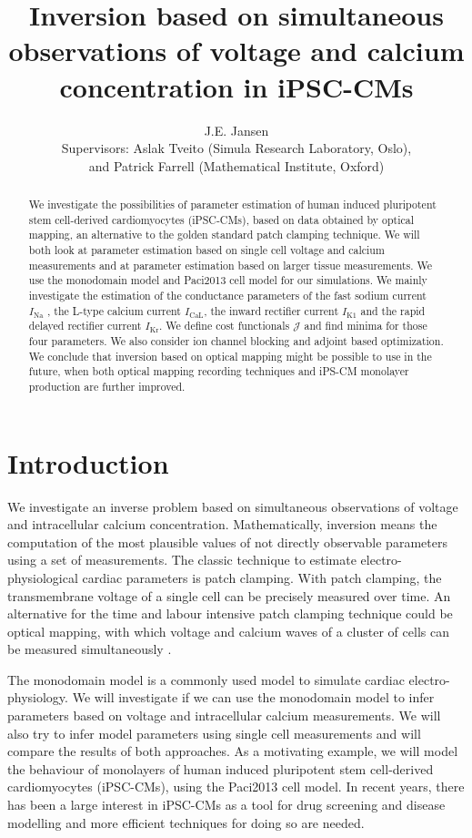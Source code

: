 \documentclass{article}
\title{Inversion based on simultaneous observations of voltage and calcium concentration in iPSC-CMs}
\author{J.E. Jansen \\[8 pt] Supervisors: Aslak Tveito (Simula Research Laboratory, Oslo), \\ and Patrick Farrell (Mathematical Institute, Oxford)
}
\begin{document}
%
\maketitle
%
\begin{abstract}We investigate the possibilities of parameter estimation of human induced pluripotent stem cell-derived cardiomyocytes (iPSC-CMs), based on data obtained by optical mapping, an alternative to the golden standard patch clamping technique. We will both look at parameter estimation based on single cell voltage and calcium measurements and at parameter estimation based on larger tissue measurements. We use the monodomain model and Paci2013 cell model for our simulations. We mainly investigate the estimation of the conductance parameters of the fast sodium current $I_{\mathrm{Na}}$ , the L-type calcium current $I_{\mathrm{CaL}}$, the inward rectifier current $I_{\mathrm{K1}}$ and the rapid delayed rectifier current $I_{\mathrm{Kr}}$. We define cost functionals $\mathcal{J}$ and find minima for those four parameters. We also consider ion channel blocking and adjoint based optimization. We conclude that inversion based on optical mapping might be possible to use in the future, when both optical mapping recording techniques and iPS-CM monolayer production are further improved.
\end{abstract}
\section{Introduction} \label{Introduction}
We investigate an inverse problem based on simultaneous observations of voltage and intracellular calcium concentration. 
Mathematically, inversion means the computation of the most plausible values of not directly observable parameters using a set of measurements. The classic technique to estimate electro-physiological cardiac parameters is patch clamping. With patch clamping, the transmembrane voltage of a single cell can be precisely measured over time. An alternative for the time and labour intensive patch clamping technique could be optical mapping, with which voltage and calcium waves of a cluster of cells can be measured simultaneously \cite{Lee2012}. 

The monodomain model is a commonly used model to simulate cardiac electro-physiology. We will investigate if we can use the monodomain model to infer parameters based on voltage and intracellular calcium measurements. We will also try to infer model parameters using single cell measurements and will compare the results of both approaches. As a motivating example, we will model the behaviour of monolayers of human induced pluripotent stem cell-derived cardiomyocytes (iPSC-CMs), using the Paci2013 cell model. In recent years, there has been a large interest in iPSC-CMs as a tool for drug screening and disease modelling and more efficient techniques for doing so are needed.
%
\end{document}
